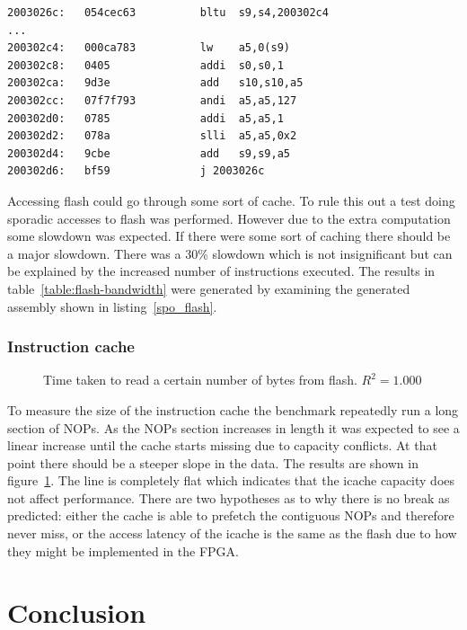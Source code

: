\documentclass{article}
\begin{document}
\begin{lstlisting}[caption={Sporadic flash copy disassembly}, label={spo_flash}]
2003026c:	054cec63          bltu	s9,s4,200302c4 
...
200302c4:	000ca783          lw	a5,0(s9)
200302c8:	0405              addi	s0,s0,1
200302ca:	9d3e              add	s10,s10,a5
200302cc:	07f7f793          andi	a5,a5,127
200302d0:	0785              addi	a5,a5,1
200302d2:	078a              slli	a5,a5,0x2
200302d4:	9cbe              add	s9,s9,a5
200302d6:	bf59              j	2003026c 
\end{lstlisting}

Accessing flash could go through some sort of cache. To rule this out a test doing sporadic accesses to flash was performed. However due to the extra computation some slowdown was expected. If there were some sort of caching there should be a major slowdown. There was a 30\% slowdown which is not insignificant but can be explained by the increased number of instructions executed. The results in  table~\ref{table:flash-bandwidth} were generated by examining the generated assembly shown in listing~\ref{spo_flash}.

\subsubsection{Instruction cache} \label{sec:icache}
\begin{figure}[htbp]
  \centering
  
  \caption{Time taken to read a certain number of bytes from flash. $R^2 = 1.000$}
  \label{fig:icache}
\end{figure}

To measure the size of the instruction cache the benchmark repeatedly run a long section of NOPs. As the NOPs section increases in length it was expected to see a linear increase until the cache starts missing due to capacity conflicts. At that point there should be a steeper slope in the data. The results are shown in figure~\ref{fig:icache}. The line is completely flat which indicates that the icache capacity does not affect performance. There are two hypotheses as to why there is no break as predicted: either the cache is able to prefetch the contiguous NOPs and therefore never miss, or the access latency of the icache is the same as the flash due to how they might be implemented in the FPGA.

\section{Conclusion}
\end{document}
